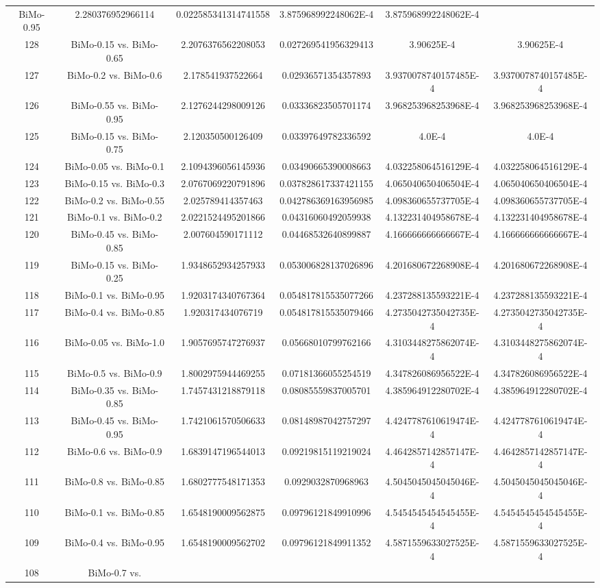 \documentclass[a4paper,10pt]{article}
\begin{document}
\begin{landscape}
\begin{table}[!htp]
\begin{tabular}{cccccc}
BiMo-0.95&2.280376952966114&0.022585341314741558&3.875968992248062E-4&3.875968992248062E-4\\128&BiMo-0.15 vs. BiMo-0.65&2.2076376562208053&0.027269541956329413&3.90625E-4&3.90625E-4\\127&BiMo-0.2 vs. BiMo-0.6&2.178541937522664&0.02936571354357893&3.9370078740157485E-4&3.9370078740157485E-4\\126&BiMo-0.55 vs. BiMo-0.95&2.1276244298009126&0.03336823505701174&3.968253968253968E-4&3.968253968253968E-4\\125&BiMo-0.15 vs. BiMo-0.75&2.120350500126409&0.03397649782336592&4.0E-4&4.0E-4\\124&BiMo-0.05 vs. BiMo-0.1&2.1094396056145936&0.03490665390008663&4.032258064516129E-4&4.032258064516129E-4\\123&BiMo-0.15 vs. BiMo-0.3&2.0767069220791896&0.037828617337421155&4.065040650406504E-4&4.065040650406504E-4\\122&BiMo-0.2 vs. BiMo-0.55&2.025789414357463&0.042786369163956985&4.098360655737705E-4&4.098360655737705E-4\\121&BiMo-0.1 vs. BiMo-0.2&2.0221524495201866&0.04316060492059938&4.132231404958678E-4&4.132231404958678E-4\\120&BiMo-0.45 vs. BiMo-0.85&2.007604590171112&0.04468532640899887&4.166666666666667E-4&4.166666666666667E-4\\119&BiMo-0.15 vs. BiMo-0.25&1.9348652934257933&0.053006828137026896&4.201680672268908E-4&4.201680672268908E-4\\118&BiMo-0.1 vs. BiMo-0.95&1.9203174340767364&0.054817815535077266&4.237288135593221E-4&4.237288135593221E-4\\117&BiMo-0.4 vs. BiMo-0.85&1.920317434076719&0.054817815535079466&4.2735042735042735E-4&4.2735042735042735E-4\\116&BiMo-0.05 vs. BiMo-1.0&1.9057695747276937&0.05668010799762166&4.3103448275862074E-4&4.3103448275862074E-4\\115&BiMo-0.5 vs. BiMo-0.9&1.8002975944469255&0.07181366055254519&4.347826086956522E-4&4.347826086956522E-4\\114&BiMo-0.35 vs. BiMo-0.85&1.7457431218879118&0.08085559837005701&4.385964912280702E-4&4.385964912280702E-4\\113&BiMo-0.45 vs. BiMo-0.95&1.7421061570506633&0.08148987042757297&4.4247787610619474E-4&4.4247787610619474E-4\\112&BiMo-0.6 vs. BiMo-0.9&1.6839147196544013&0.09219815119219024&4.4642857142857147E-4&4.4642857142857147E-4\\111&BiMo-0.8 vs. BiMo-0.85&1.6802777548171353&0.0929032870968963&4.5045045045045046E-4&4.5045045045045046E-4\\110&BiMo-0.1 vs. BiMo-0.85&1.6548190009562875&0.09796121849910996&4.5454545454545455E-4&4.5454545454545455E-4\\109&BiMo-0.4 vs. BiMo-0.95&1.6548190009562702&0.09796121849911352&4.5871559633027525E-4&4.5871559633027525E-4\\108&BiMo-0.7 vs. 
\end{tabular}
\end{table}
\end{landscape}
\end{document}
